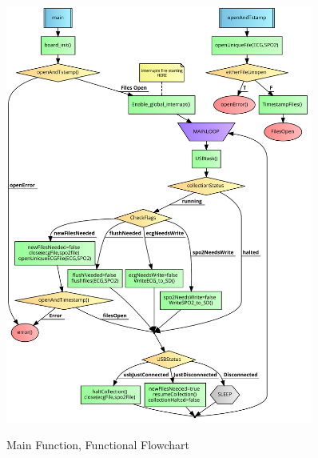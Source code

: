 \begin{figure}
	\begin{center}
		\label{fig:flowchart_main}
		\includegraphics[scale=1,width=0.9\textwidth]{Images/FlowChartMain.pdf} 
		\caption{Main Function, Functional Flowchart}
	\end{center}
\end{figure}

